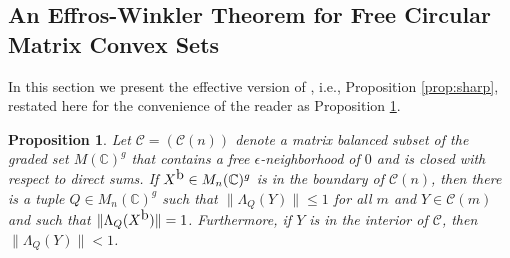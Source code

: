 \documentclass[12pt,makeidx]{amsart}
\newtheorem{prop}[theorem]{Proposition}
\def\beq{\begin{equation}}
\def\eeq{\end{equation}}
\numberwithin{equation}{section}
\def\bbF{ {\mathbb C}}
\def\cC{ {\mathcal C} }
\def\oX{X^{\mbox{\rm{b}}}}
\begin{document}
\subsection{An Effros-Winkler Theorem for Free Circular Matrix Convex Sets}
 
 In this section we present the effective version of \cite[Proposition 3.5]{BVM}, i.e.,
Proposition \ref{prop:sharp}, restated here for the convenience of the reader as
  Proposition \ref{prop:2sharp}.


\begin{prop}
 \label{prop:2sharp}
 Let $\cC=(\cC(n))$ denote a  matrix balanced
 subset of the graded set  $M(\bbF)^g$ that 
 contains a free $\epsilon$-neighborhood of $0$ and is closed with respect to direct sums.
 If $\oX\in M_n(\bbF)^g$ is in the boundary of $\cC(n)$,
 then there is a tuple $Q\in M_n(\bbF)^g$ such that 
 $\|\Lambda_Q(Y)\|\le 1$ for all $m$ and
 $Y\in\cC(m)$  and such that  $\|\Lambda_Q(\oX)\|=1$. 
 Furthermore,
 if $Y$ is in the interior of $\cC$, then $\|\Lambda_Q(Y)\|<1$.
\end{prop}



\def\beq{\begin{equation}
}
\def\eeq{\end{equation}}
\end{document}
